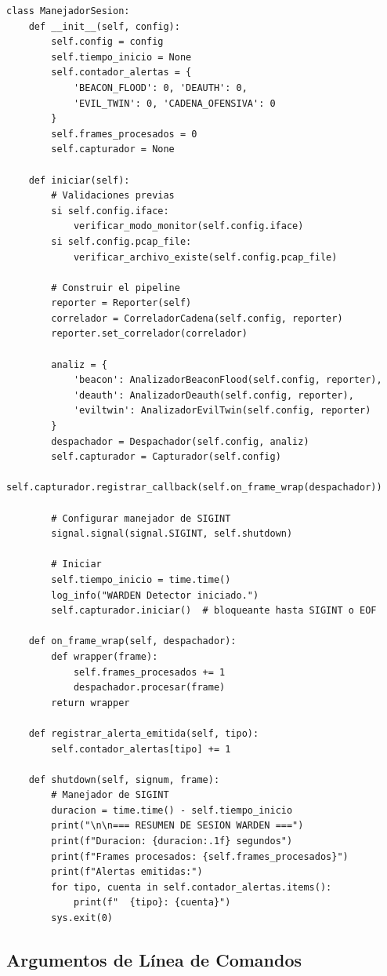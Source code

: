 \documentclass[11pt,a4paper]{article}
\begin{document}
\begin{lstlisting}
class ManejadorSesion:
    def __init__(self, config):
        self.config = config
        self.tiempo_inicio = None
        self.contador_alertas = {
            'BEACON_FLOOD': 0, 'DEAUTH': 0,
            'EVIL_TWIN': 0, 'CADENA_OFENSIVA': 0
        }
        self.frames_procesados = 0
        self.capturador = None

    def iniciar(self):
        # Validaciones previas
        si self.config.iface:
            verificar_modo_monitor(self.config.iface)
        si self.config.pcap_file:
            verificar_archivo_existe(self.config.pcap_file)

        # Construir el pipeline
        reporter = Reporter(self)
        correlador = CorreladorCadena(self.config, reporter)
        reporter.set_correlador(correlador)

        analiz = {
            'beacon': AnalizadorBeaconFlood(self.config, reporter),
            'deauth': AnalizadorDeauth(self.config, reporter),
            'eviltwin': AnalizadorEvilTwin(self.config, reporter)
        }
        despachador = Despachador(self.config, analiz)
        self.capturador = Capturador(self.config)
        self.capturador.registrar_callback(self.on_frame_wrap(despachador))

        # Configurar manejador de SIGINT
        signal.signal(signal.SIGINT, self.shutdown)

        # Iniciar
        self.tiempo_inicio = time.time()
        log_info("WARDEN Detector iniciado.")
        self.capturador.iniciar()  # bloqueante hasta SIGINT o EOF

    def on_frame_wrap(self, despachador):
        def wrapper(frame):
            self.frames_procesados += 1
            despachador.procesar(frame)
        return wrapper

    def registrar_alerta_emitida(self, tipo):
        self.contador_alertas[tipo] += 1

    def shutdown(self, signum, frame):
        # Manejador de SIGINT
        duracion = time.time() - self.tiempo_inicio
        print("\n\n=== RESUMEN DE SESION WARDEN ===")
        print(f"Duracion: {duracion:.1f} segundos")
        print(f"Frames procesados: {self.frames_procesados}")
        print(f"Alertas emitidas:")
        for tipo, cuenta in self.contador_alertas.items():
            print(f"  {tipo}: {cuenta}")
        sys.exit(0)
\end{lstlisting}

\subsection{Argumentos de Línea de Comandos}
\end{document}
